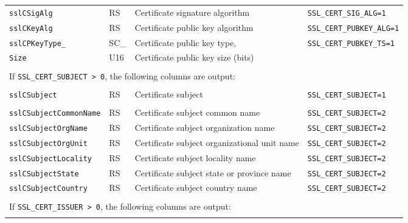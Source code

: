 \documentclass[documentation]{subfiles}
\begin{document}
\begin{longtable}{llll}
    {\tt sslCSigAlg}     & RS         & Certificate signature algorithm           & {\small\tt SSL\_CERT\_SIG\_ALG=1}\\
    {\tt sslCKeyAlg}     & RS         & Certificate public key algorithm          & {\small\tt SSL\_CERT\_PUBKEY\_ALG=1}\\
    {\tt sslCPKeyType\_} & SC\_       & Certificate public key type,              & {\small\tt SSL\_CERT\_PUBKEY\_TS=1}\\
    {\tt \qquad Size}    & \qquad U16 & \qquad Certificate public key size (bits) & \\\\

    \multicolumn{4}{l}{If {\tt SSL\_CERT\_SUBJECT > 0}, the following columns are output:}\\\\

    {\tt sslCSubject}             & RS & Certificate subject                          & {\small\tt SSL\_CERT\_SUBJECT=1}\\\\
    {\tt sslCSubjectCommonName}   & RS & Certificate subject common name              & {\small\tt SSL\_CERT\_SUBJECT=2}\\
    {\tt sslCSubjectOrgName}      & RS & Certificate subject organization name        & {\small\tt SSL\_CERT\_SUBJECT=2}\\
    {\tt sslCSubjectOrgUnit}      & RS & Certificate subject organizational unit name & {\small\tt SSL\_CERT\_SUBJECT=2}\\
    {\tt sslCSubjectLocality}     & RS & Certificate subject locality name            & {\small\tt SSL\_CERT\_SUBJECT=2}\\
    {\tt sslCSubjectState}        & RS & Certificate subject state or province name   & {\small\tt SSL\_CERT\_SUBJECT=2}\\
    {\tt sslCSubjectCountry}      & RS & Certificate subject country name             & {\small\tt SSL\_CERT\_SUBJECT=2}\\\\

    \multicolumn{4}{l}{If {\tt SSL\_CERT\_ISSUER > 0}, the following columns are output:}\\\\


\end{longtable}
\end{document}
